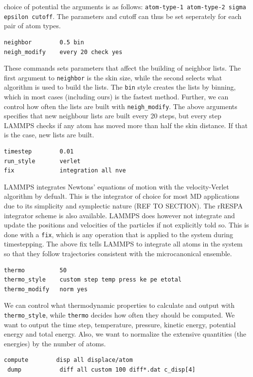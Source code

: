\documentclass[twoside,english]{uiofysmaster}
\begin{document}
choice of potential the arguments is as follows:
\texttt{atom-type-1 atom-type-2 sigma epsilon cutoff}. 
The parameters and cutoff can thus be set seperately 
for each pair of atom types.
\begin{lstlisting}[style=lammps]
neighbor		0.5 bin
neigh_modify	every 20 check yes
\end{lstlisting}
These commands sets parameters that affect the 
building of neighbor lists. The first argument
to \texttt{neighbor} is the skin size, while the 
second selects what algorithm is used
to build the lists. The \texttt{bin} style creates 
the lists by binning, which in most cases
(including ours) is the fastest method. 
Further, we can control how often the lists
are built with \texttt{neigh\_modify}. The above arguments
specifies that new neighbour lists are built 
every 20 steps, but every step LAMMPS checks
if any atom has moved more than half the skin distance.
If that is the case, new lists are built. 
\begin{lstlisting}[style=lammps]
timestep 		0.01
run_style 		verlet
fix 			integration all nve
\end{lstlisting}
LAMMPS integrates Newtons' equations of motion
with the velocity-Verlet algorithm by defualt. 
This is the integrator of choice for most MD
applications due to its simplicity and 
symplectic nature (REF TO SECTION). The 
rRESPA integrator \cite{Tuckerman92} scheme is also available.
LAMMPS does however not integrate and update
the positions and velocities of the particles
if not explicitly told so. This is done with
a \texttt{fix}, which is any operation that is applied to the 
system during timestepping. The above fix 
tells LAMMPS to integrate all atoms in the system 
so that they follow trajectories consistent with 
the microcanonical ensemble. 
\begin{lstlisting}[style=lammps]
thermo			50
thermo_style 	custom step temp press ke pe etotal 
thermo_modify 	norm yes
\end{lstlisting}
We can control what thermodynamic properties 
to calculate and output with \texttt{thermo\_style}, while 
\texttt{thermo} decides how often they should be computed. 
We want to output the time step, temperature, 
pressure, kinetic energy, potential energy and total
energy. Also, we want to normalize the extensive
quantities (the energies) by the number of atoms. 
\begin{lstlisting}[style=lammps]
 compute 		disp all displace/atom
 dump 			diff all custom 100 diff*.dat c_disp[4]
\end{lstlisting}
\end{document}
